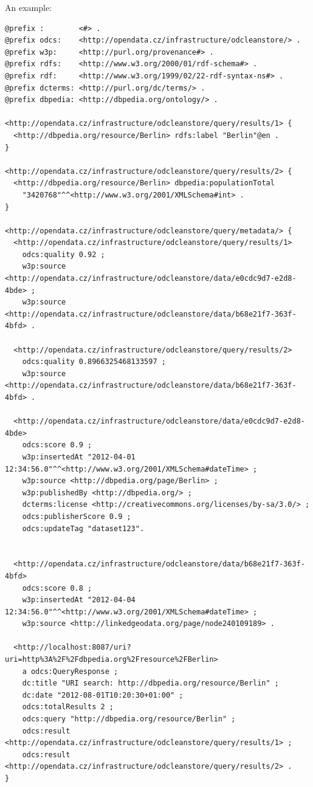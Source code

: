 {\pagebreak[3]

An example:

\begin{lstlisting}[caption={Example of URI or keyword query response in TriG},label=lst:URIKWTrigResponse]
@prefix :        <#> .
@prefix odcs:    <http://opendata.cz/infrastructure/odcleanstore/> .
@prefix w3p:     <http://purl.org/provenance#> .
@prefix rdfs:    <http://www.w3.org/2000/01/rdf-schema#> .
@prefix rdf:     <http://www.w3.org/1999/02/22-rdf-syntax-ns#> .
@prefix dcterms: <http://purl.org/dc/terms/> .
@prefix dbpedia: <http://dbpedia.org/ontology/> .

<http://opendata.cz/infrastructure/odcleanstore/query/results/1> {
  <http://dbpedia.org/resource/Berlin> rdfs:label "Berlin"@en .
}

<http://opendata.cz/infrastructure/odcleanstore/query/results/2> {
  <http://dbpedia.org/resource/Berlin> dbpedia:populationTotal
    "3420768"^^<http://www.w3.org/2001/XMLSchema#int> .
}

<http://opendata.cz/infrastructure/odcleanstore/query/metadata/> {
  <http://opendata.cz/infrastructure/odcleanstore/query/results/1>
    odcs:quality 0.92 ;
    w3p:source <http://opendata.cz/infrastructure/odcleanstore/data/e0cdc9d7-e2d8-4bde> ;
    w3p:source <http://opendata.cz/infrastructure/odcleanstore/data/b68e21f7-363f-4bfd> .

  <http://opendata.cz/infrastructure/odcleanstore/query/results/2>
    odcs:quality 0.8966325468133597 ;
    w3p:source <http://opendata.cz/infrastructure/odcleanstore/data/b68e21f7-363f-4bfd> .

  <http://opendata.cz/infrastructure/odcleanstore/data/e0cdc9d7-e2d8-4bde>
    odcs:score 0.9 ;
    w3p:insertedAt "2012-04-01 12:34:56.0"^^<http://www.w3.org/2001/XMLSchema#dateTime> ;
    w3p:source <http://dbpedia.org/page/Berlin> ;
    w3p:publishedBy <http://dbpedia.org/> ;
    dcterms:license <http://creativecommons.org/licenses/by-sa/3.0/> ;
    odcs:publisherScore 0.9 ;
    odcs:updateTag "dataset123".
	

  <http://opendata.cz/infrastructure/odcleanstore/data/b68e21f7-363f-4bfd>
    odcs:score 0.8 ;
    w3p:insertedAt "2012-04-04 12:34:56.0"^^<http://www.w3.org/2001/XMLSchema#dateTime> ;
    w3p:source <http://linkedgeodata.org/page/node240109189> .

  <http://localhost:8087/uri?uri=http%3A%2F%2Fdbpedia.org%2Fresource%2FBerlin>
    a odcs:QueryResponse ;
    dc:title "URI search: http://dbpedia.org/resource/Berlin" ;
    dc:date "2012-08-01T10:20:30+01:00" ;
    odcs:totalResults 2 ;
    odcs:query "http://dbpedia.org/resource/Berlin" ;
    odcs:result <http://opendata.cz/infrastructure/odcleanstore/query/results/1> ;
    odcs:result <http://opendata.cz/infrastructure/odcleanstore/query/results/2> .
}
\end{lstlisting}

}
